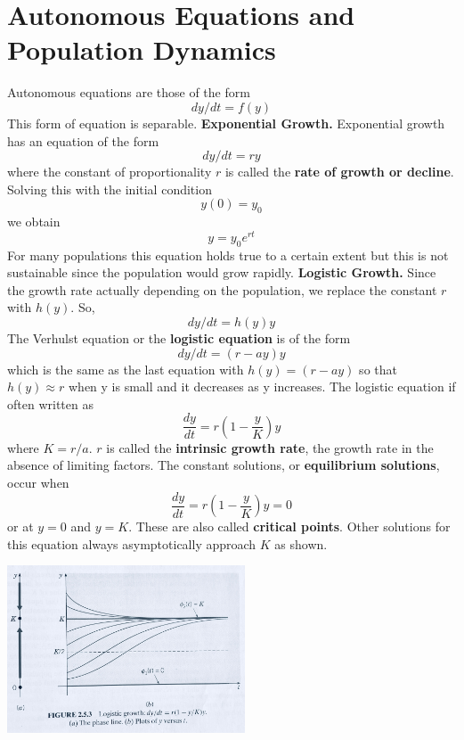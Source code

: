 \section{Autonomous Equations and Population Dynamics}
    Autonomous equations are those of the form
    \begin{equation*}
        dy/dt = f(y)
    \end{equation*}
    This form of equation is separable.
    \newline
    \textbf{Exponential Growth.} Exponential growth has an equation of the form 
    \begin{equation*}
        dy/dt = ry
    \end{equation*}
    where the constant of proportionality $r$ is called the \textbf{rate of growth or decline}. Solving this with the initial condition $$y(0) = y_0$$ we obtain $$y = y_0e^{rt}$$
    For many populations this equation holds true to a certain extent but this is not sustainable since the population would grow rapidly.
    \newline
    \textbf{Logistic Growth.} Since the growth rate actually depending on the population, we replace the constant $r$ with $h(y)$. So, 
    \begin{equation*}
        dy/dt = h(y)y
    \end{equation*}
    The Verhulst equation or the \textbf{logistic equation} is of the form
    \begin{equation*}
        dy/dt = (r-ay)y
    \end{equation*}
    which is the same as the last equation with $h(y) = (r - ay)$ so that $h(y) \approx r$ when y is small and it decreases as y increases. The logistic equation if often written as 
    \begin{equation*}
        \frac{dy}{dt} = r(1 - \frac{y}{K})y
    \end{equation*}
    where $K = r/a$. $r$ is called the \textbf{intrinsic growth rate}, the growth rate in the absence of limiting factors. 
    \newline \indent
    The constant solutions, or \textbf{equilibrium solutions}, occur when
    \begin{equation*}
        \frac{dy}{dt} = r(1 - \frac{y}{K})y = 0
    \end{equation*}
    or at $y = 0$ and $y = K$. These are also called \textbf{critical points}. 
    \newline \indent
    Other solutions for this equation always asymptotically approach $K$ as shown. 
    \begin{center}
        \includegraphics[width=200pt]{logistic_solutions.jpg}
    \end{center}
        
    